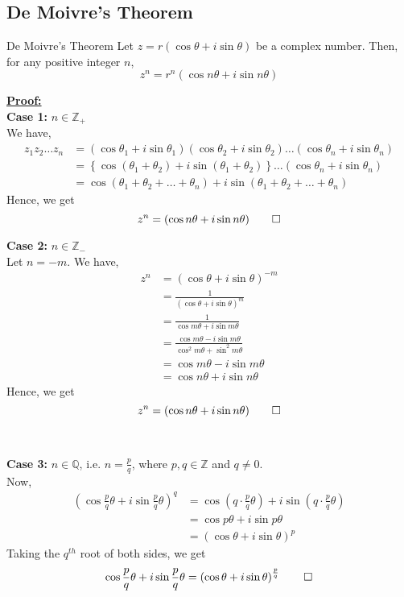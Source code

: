 \subsection{De Moivre's Theorem}
\begin{theorem}{De Moivre's Theorem}{}
    Let $z = r(\cos\theta + i\sin\theta)$ be a complex number. Then, for any positive integer $n$,
    \begin{equation}
        z^n = r^n(\cos n\theta + i\sin n\theta)
    \end{equation}
\end{theorem}

\underline{\textbf{Proof:}} \\
\textbf{Case 1:} $n \in \mathbb{Z_+}$ \\
We have,
\begin{align*}
    z_1 z_2 \ldots z_n &= (\cos\theta_1 + i\sin\theta_1) (\cos\theta_2 + i\sin\theta_2) \ldots (\cos\theta_n + i\sin\theta_n) \\
    &= \left\{ \cos(\theta_1 + \theta_2) + i\sin(\theta_1 + \theta_2) \right\} \ldots (\cos\theta_n + i\sin\theta_n) \\
    &= \cos(\theta_1 + \theta_2 + \ldots + \theta_n) + i\sin(\theta_1 + \theta_2 + \ldots + \theta_n)
\end{align*}
Hence, we get
\[
    z^n = (\cos n\theta + i\sin n\theta) \qed
\]

\pagebreak
\textbf{Case 2:} $n \in \mathbb{Z_-}$ \\
Let $n=-m$. We have,
\begin{align*}
    z^n &= (\cos\theta + i\sin\theta)^{-m} \\
    &= \frac{1}{(\cos\theta + i\sin\theta)^m} \\
    &= \frac{1}{\cos m\theta + i\sin m\theta} \\
    &= \frac{\cos m\theta - i\sin m\theta}{\cos^2 m\theta + \sin^2 m\theta} \\
    &= \cos m\theta - i\sin m\theta \\
    &= \cos n\theta + i\sin n\theta
\end{align*}
Hence, we get
\[
    z^n = (\cos n\theta + i\sin n\theta) \qed
\] \\~\\

\textbf{Case 3:} $n \in \mathbb{Q}$, i.e. $n = \frac{p}{q}$, where $p,q \in \mathbb{Z}$ and $q \neq 0$. \\
Now,
\begin{align*}
    \left( \cos \frac{p}{q}\theta + i\sin \frac{p}{q}\theta \right)^q &= \cos \left( q \cdot \frac{p}{q} \theta \right) + i\sin \left( q \cdot \frac{p}{q}\theta \right) \\
    &= \cos p\theta + i\sin p\theta \\
    &= (\cos\theta + i\sin\theta)^p
\end{align*}
Taking the $q^{th}$ root of both sides, we get
\[
    \cos \frac{p}{q}\theta + i\sin \frac{p}{q}\theta = \left( \cos\theta + i\sin\theta \right)^{\frac{p}{q}} \qed
\]

